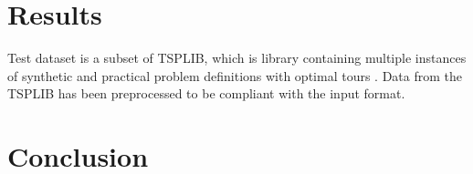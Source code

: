 \section*{Results}

Test dataset is a subset of TSPLIB, which is library containing multiple instances of synthetic and practical problem definitions with optimal tours \cite{reinhel2014tsplib}. Data from the TSPLIB has been preprocessed to be compliant with the input format.



\section*{Conclusion}
